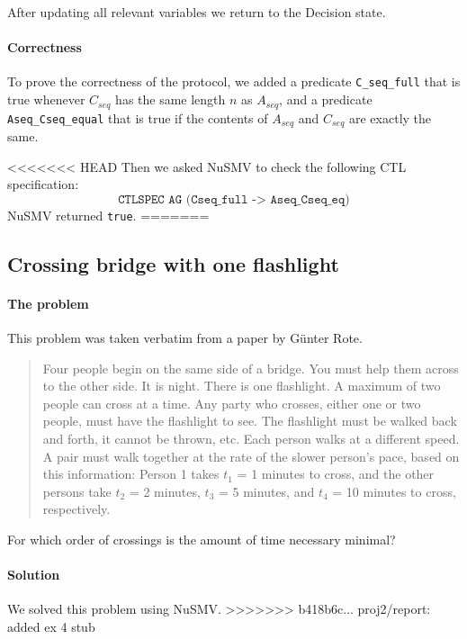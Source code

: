\documentclass[12pt]{article}
\begin{document}
After updating all relevant variables we return to the Decision state.

\paragraph{Correctness} To prove the correctness of the protocol, 
we added a predicate \texttt{C\_seq\_full} that is true 
whenever $C_{seq}$ has the same length $n$ as $A_{seq}$, 
and a predicate \texttt{Aseq\_Cseq\_equal} that is true 
if the contents of $A_{seq}$ and $C_{seq}$ are exactly the same.

<<<<<<< HEAD
Then we asked NuSMV to check the following CTL specification:
\[ \texttt{CTLSPEC AG (Cseq\_full -> Aseq\_Cseq\_eq)} \]
NuSMV returned \texttt{true}.
=======
\subsection*{Crossing bridge with one flashlight}
\paragraph{The problem}

This problem was taken verbatim from a paper by G\"unter Rote. \cite{rote2002crossing}

\begin{quotation}
Four people begin on the same side of a bridge.
You must help them across to the other side.
It is night.
There is one flashlight.
A maximum of two people can cross at a time.
Any party who crosses, either one or two people, must have the flashlight to see.
The flashlight must be walked back and forth, it cannot be thrown, etc.
Each person walks at a different speed.
A pair must walk together at the rate of the slower person's pace, based on this information:
Person 1 takes $t_1$ = 1 minutes to cross, and the other persons take $t_2$ = 2
minutes, $t_3$ = 5 minutes, and $t_4$ = 10 minutes to cross, respectively.
\end{quotation}

For which order of crossings is the amount of time necessary minimal?

\paragraph{Solution}
We solved this problem using NuSMV.
>>>>>>> b418b6c... proj2/report: added ex 4 stub
\end{document}
